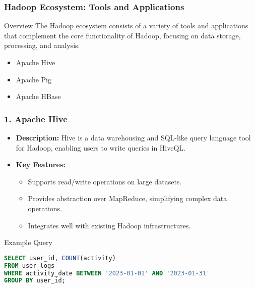 \documentclass[aspectratio=169]{beamer}
\begin{document}
\begin{frame}
    \frametitle{Hadoop Ecosystem: Tools and Applications}
    \begin{block}{Overview}
        The Hadoop ecosystem consists of a variety of tools and applications that complement the core functionality of Hadoop, focusing on data storage, processing, and analysis.
    \end{block}
    \begin{itemize}
        \item Apache Hive
        \item Apache Pig
        \item Apache HBase
    \end{itemize}
\end{frame}

\begin{frame}[fragile]
    \frametitle{1. Apache Hive}
    \begin{itemize}
        \item \textbf{Description:} Hive is a data warehousing and SQL-like query language tool for Hadoop, enabling users to write queries in HiveQL.
        \item \textbf{Key Features:}
        \begin{itemize}
            \item Supports read/write operations on large datasets.
            \item Provides abstraction over MapReduce, simplifying complex data operations.
            \item Integrates well with existing Hadoop infrastructures.
        \end{itemize}
    \end{itemize}
    
    \begin{block}{Example Query}
        \begin{lstlisting}[language=SQL]
SELECT user_id, COUNT(activity) 
FROM user_logs 
WHERE activity_date BETWEEN '2023-01-01' AND '2023-01-31' 
GROUP BY user_id;
        \end{lstlisting}
    \end{block}
\end{frame}
\end{document}
